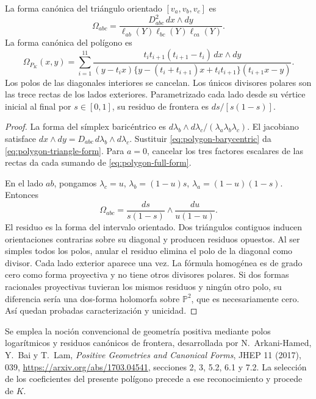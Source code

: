 \begin{theorem}
\label{thm:polygon-form}
La forma canónica del triángulo orientado \([v_a,v_b,v_c]\) es
\begin{equation}
 \Omega_{abc}=
 \frac{D_{abc}^2\,dx\wedge dy}
 {\ell_{ab}(Y)\ell_{bc}(Y)\ell_{ca}(Y)}.
 \label{eq:polygon-triangle-form}
\end{equation}
La forma canónica del polígono es
\begin{equation}
 \boxed{\displaystyle
 \Omega_{P_K}(x,y)=
 \sum_{i=1}^{11}
 \frac{t_it_{i+1}(t_{i+1}-t_i)\,dx\wedge dy}
 {(y-t_ix)\{y-(t_i+t_{i+1})x+t_it_{i+1}\}(t_{i+1}x-y)}.}
 \label{eq:polygon-full-form}
\end{equation}
Los polos de las diagonales interiores se cancelan. Los únicos divisores
polares son las trece rectas de los lados exteriores. Parametrizado cada
lado desde su vértice inicial al final por \(s\in[0,1]\), su residuo de
frontera es \(ds/[s(1-s)]\).
\end{theorem}
\begin{proof}
La forma del símplex baricéntrico es
\(d\lambda_b\wedge d\lambda_c/(\lambda_a\lambda_b\lambda_c)\).
El jacobiano satisface
\(dx\wedge dy=D_{abc}\,d\lambda_b\wedge d\lambda_c\).
Sustituir \eqref{eq:polygon-barycentric} da
\eqref{eq:polygon-triangle-form}. Para \(a=0\), cancelar los tres factores
escalares de las rectas da cada sumando de \eqref{eq:polygon-full-form}.

En el lado \(ab\), pongamos \(\lambda_c=u\),
\(\lambda_b=(1-u)s\), \(\lambda_a=(1-u)(1-s)\). Entonces
\[
 \Omega_{abc}=\frac{ds}{s(1-s)}\wedge\frac{du}{u(1-u)}.
\]
El residuo es la forma del intervalo orientado. Dos triángulos contiguos
inducen orientaciones contrarias sobre su diagonal y producen residuos
opuestos. Al ser simples todos los polos, anular el residuo elimina el
polo de la diagonal como divisor. Cada lado exterior aparece una vez.
La fórmula homogénea es de grado cero como forma proyectiva y no tiene
otros divisores polares. Si dos formas racionales proyectivas tuvieran los
mismos residuos y ningún otro polo, su diferencia sería una dos-forma
holomorfa sobre \(\mathbb P^2\), que es necesariamente cero. Así quedan
probadas caracterización y unicidad.
\end{proof}

Se emplea la noción convencional de geometría positiva mediante polos
logarítmicos y residuos canónicos de frontera, desarrollada por
N.~Arkani-Hamed, Y.~Bai y T.~Lam, \emph{Positive Geometries and Canonical
Forms}, JHEP 11 (2017), 039,
\url{https://arxiv.org/abs/1703.04541}, secciones 2, 3, 5.2, 6.1 y 7.2.
La selección de los coeficientes del presente polígono precede a ese
reconocimiento y procede de \(K\).

